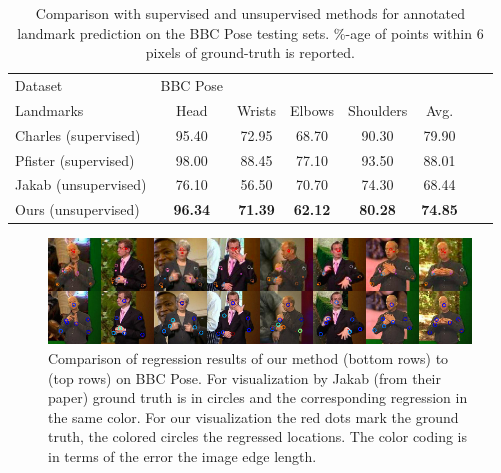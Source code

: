			\begin{table}[htp]
				\centering
				\begin{tabular}{l|ccccccr}
				\hline
				Dataset & BBC Pose &  &  &  & &  &  \\
				Landmarks & {\footnotesize Head} & {\footnotesize Wrists} &  {\footnotesize Elbows }& {\footnotesize Shoulders } & {\footnotesize Avg.}  \\
				\hline
				Charles \etal \cite{charles13bbcpose}  (supervised)&
				95.40 & 72.95 & 68.70 & 90.30 & 79.90  \\
				Pfister \etal  \cite{pfister15flowingconv} (supervised) &
				98.00 & 88.45 & 77.10 & 93.50 & 88.01  \\ \hline
				Jakab \etal \cite{jakab18}  (unsupervised) &
				76.10& 56.50& 70.70& 74.30 &68.44  \\
				Ours (unsupervised)  & \textbf{96.34} & \textbf{71.39} & \textbf{62.12} & \textbf{80.28}& \textbf{74.85} \\
				\hline
				\end{tabular}
				\caption{{Comparison with supervised and unsupervised methods for annotated landmark prediction on the BBC Pose testing sets.
				\%-age of points within 6 pixels of ground-truth is reported.}}
				\label{tab:gtregressionhuman}
			\end{table}

			\begin{figure}[htp]
				\centering
				\includegraphics[trim={0cm 0cm 0cm 0cm},clip, width=1.\linewidth]{fig/shape/bbc8}
				\caption{Comparison of regression results of our method (bottom rows) to \cite{jakab18} (top rows) on BBC Pose. For visualization by Jakab \etal (from their paper) ground truth is in circles and the corresponding regression in the same color. For our visualization the red dots mark the ground truth, the colored circles the regressed locations. The color coding is in terms of the error \wrt the image edge length.}
				\label{fig:bbc8}
			\end{figure}


